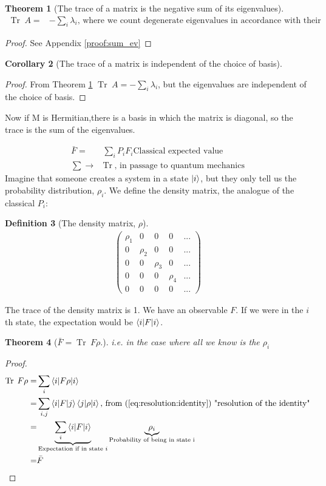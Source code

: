 \documentclass[]{article}
\newtheorem{thm}{Theorem}
\newtheorem{defn}[thm]{Definition}
\newtheorem{cor}[thm]{Corollary}
\DeclareMathOperator{\Tr}{Tr \;}
\begin{document}
\begin{thm}[The trace of a matrix is the negative sum of its eigenvalues]\label{thm:sum:ev}
	\begin{align*}
		\Tr A =& - \sum_i \lambda_i \text{, where we count degenerate eigenvalues in accordance with their multiplicity.}
	\end{align*}
\end{thm}

\begin{proof}
	See Appendix \ref{proof:sum_ev}
\end{proof}

\begin{cor}[The trace of a matrix is independent of the choice of basis]\end{cor}
\begin{proof}
	From Theorem \ref{thm:sum:ev} $\Tr A = - \sum_i \lambda_i$, but the eigenvalues are independent of the choice of basis.
\end{proof}

Now if M is Hermitian,there is a basis in which the matrix is diagonal, so the trace is the sum of the eigenvalues.

\begin{align*}
	\bar{F} =& \sum_i P_i F_i \text{Classical expected value}\\
	\sum \rightarrow& \Tr \text{, in passage to quantum mechanics}
\end{align*}
Imagine that someone creates a system in a state $\ket{i}$, but they only tell us the probability distribution, $\rho_i$. We define the density matrix, the analogue of the classical $P_i$:
\begin{defn}[The density matrix, $\rho$]
	\begin{align*}
		\begin{pmatrix}
			\rho_1&0&0&0&...\\
			0&\rho_2&0&0&...\\
			0&0&\rho_3&0&...\\
			0&0&0&\rho_4&...\\
			0&0&0&0&...
		\end{pmatrix}
	\end{align*}
\end{defn}
The trace of the density matrix is 1.
We have an observable $F$. If we were in the $i$th state, the expectation would be $\braket{i\vert F \vert i}$.
\begin{thm}[$\bar{F}= \Tr F \rho$.]
	i.e. in the case where all we know is the $\rho_i$
\end{thm}
\begin{proof}
	\begin{align*}
		\Tr F \rho=&\sum_i \braket{i \vert F \rho \vert i}\\
		=& \sum_{i,j} \braket{i \vert F \vert j} \braket{j \vert \rho \vert i} \text{, from (\ref{eq:resolution:identity}) "resolution of the identity"}\\
		=& \underbrace{\sum_i \braket{i \vert F \vert i}}_\text{Expectation if in state $i$} \underbrace{\rho_i}_\text{Probability of being in state i}\\
		=& \bar{F}
	\end{align*}
\end{proof}
\end{document}
